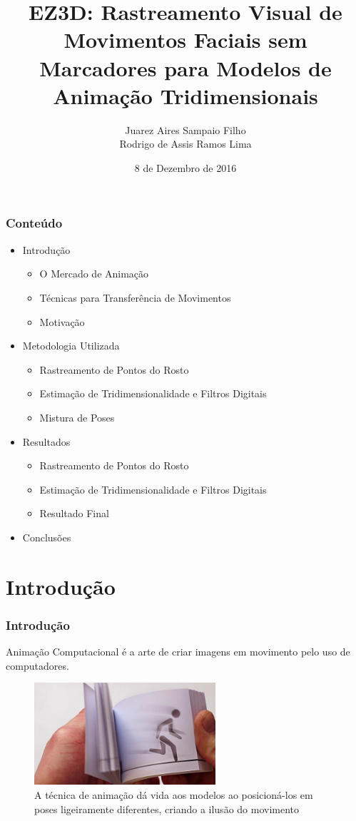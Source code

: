 \documentclass[brazil]{beamer}
\title{EZ3D: Rastreamento Visual de Movimentos Faciais sem Marcadores para Modelos de Animação Tridimensionais}
\author{Juarez Aires Sampaio Filho \\ Rodrigo de Assis Ramos Lima}
\institute{Universidade de Brasília}
\date{8 de Dezembro de 2016}
\begin{document}
\begin{frame}
        \titlepage
\end{frame}

\begin{frame}[fragile]
  \frametitle{Conteúdo}
  \begin{itemize}
     \item Introdução
     \begin{itemize}
     	\item O Mercado de Animação
     	\item Técnicas para Transferência de Movimentos
    	 	\item Motivação
   	 \end{itemize}
     \item Metodologia Utilizada
     \begin{itemize}
    	 	\item Rastreamento de Pontos do Rosto
    	 	\item Estimação de Tridimensionalidade e Filtros Digitais
    	 	\item Mistura de Poses
   	 \end{itemize}
     \item Resultados
     \begin{itemize}
    	 	\item Rastreamento de Pontos do Rosto
    	 	\item Estimação de Tridimensionalidade e Filtros Digitais
    	 	\item Resultado Final
   	 \end{itemize}
     \item Conclusões
  \end{itemize}
\end{frame}

\section{Introdução}
\begin{frame}[fragile]
  \frametitle{Introdução}

  \begin{definition}
  Animação Computacional é a arte de criar imagens em movimento pelo uso de
computadores.
  \end{definition}
      \begin{figure}
        \centering
        \includegraphics[width = 0.6\textwidth, keepaspectratio]{./img/flipBook.jpg}
        \caption{A técnica de animação dá vida aos modelos ao posicioná-los em
          poses ligeiramente diferentes, criando a ilusão do movimento }
      \end{figure}


\end{frame}
\end{document}
